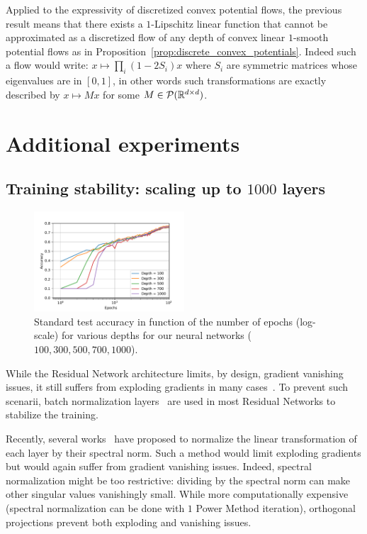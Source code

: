 Applied to the expressivity of discretized convex potential flows, the previous result means that there exists a $1$-Lipschitz linear function that cannot be approximated as a discretized flow of any depth of convex linear $1$-smooth potential flows as in Proposition~\ref{prop:discrete_convex_potentials}. Indeed such a flow would write: $x\mapsto\prod_i(1-2S_i)x$ where $S_i$ are symmetric matrices whose eigenvalues are in $[0,1]$, in other words such transformations are exactly described by $x\mapsto Mx$  for some $M\in\mathcal{P}(\mathbb{R}^{d\times d})$.




\section{Additional experiments}
\label{app:xp-supp}

\subsection{Training stability: scaling up to $1000$ layers}

\begin{figure}[h]
    \centering
    \includegraphics[width=0.5\textwidth]{sections/4_certification/images/final_cifar10_veryverydeep.pdf}
    \caption{Standard test accuracy in function of the number of epochs (log-scale) for various depths for our neural networks ($100,300,500,700,1000$).}
    \label{fig:verydeep}
\end{figure}

While the Residual Network architecture limits, by design, gradient vanishing issues, it still suffers from exploding gradients in many cases~\citep{hayou2021stable}.
To prevent such scenarii, batch normalization layers~\citep{ioffe2015batch} are used in most Residual Networks to stabilize the training.

Recently, several works~\citep{miyato2018spectral,farnia2018generalizable} have proposed to normalize the linear transformation of each layer by their spectral norm.
Such a method would limit exploding gradients but would again suffer from gradient vanishing issues.
Indeed, spectral normalization might be too restrictive: dividing by the spectral norm can make other singular values vanishingly
small.
While more computationally expensive (spectral normalization can be done with $1$ Power Method iteration), orthogonal projections prevent both exploding and vanishing issues. 

